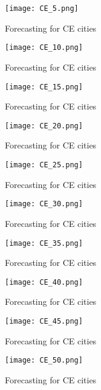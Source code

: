  \begin{figure}[!ht] 
 \centering 
 \texttt{[image: CE\_5.png]} 
 \caption{Forecasting for CE cities } 
 \label{fig:CE_5} 
 \end{figure} 
 
 \begin{figure}[!ht] 
 \centering 
 \texttt{[image: CE\_10.png]} 
 \caption{Forecasting for CE cities } 
 \label{fig:CE_10} 
 \end{figure} 
 
 \begin{figure}[!ht] 
 \centering 
 \texttt{[image: CE\_15.png]} 
 \caption{Forecasting for CE cities } 
 \label{fig:CE_15} 
 \end{figure} 
 
 \begin{figure}[!ht] 
 \centering 
 \texttt{[image: CE\_20.png]} 
 \caption{Forecasting for CE cities } 
 \label{fig:CE_20} 
 \end{figure} 
 
 \begin{figure}[!ht] 
 \centering 
 \texttt{[image: CE\_25.png]} 
 \caption{Forecasting for CE cities } 
 \label{fig:CE_25} 
 \end{figure} 
 
 \begin{figure}[!ht] 
 \centering 
 \texttt{[image: CE\_30.png]} 
 \caption{Forecasting for CE cities } 
 \label{fig:CE_30} 
 \end{figure} 
 
 \begin{figure}[!ht] 
 \centering 
 \texttt{[image: CE\_35.png]} 
 \caption{Forecasting for CE cities } 
 \label{fig:CE_35} 
 \end{figure} 
 
 \begin{figure}[!ht] 
 \centering 
 \texttt{[image: CE\_40.png]} 
 \caption{Forecasting for CE cities } 
 \label{fig:CE_40} 
 \end{figure} 
 
 \begin{figure}[!ht] 
 \centering 
 \texttt{[image: CE\_45.png]} 
 \caption{Forecasting for CE cities } 
 \label{fig:CE_45} 
 \end{figure} 
 
 \begin{figure}[!ht] 
 \centering 
 \texttt{[image: CE\_50.png]} 
 \caption{Forecasting for CE cities } 
 \label{fig:CE_50} 
 \end{figure} 
 
